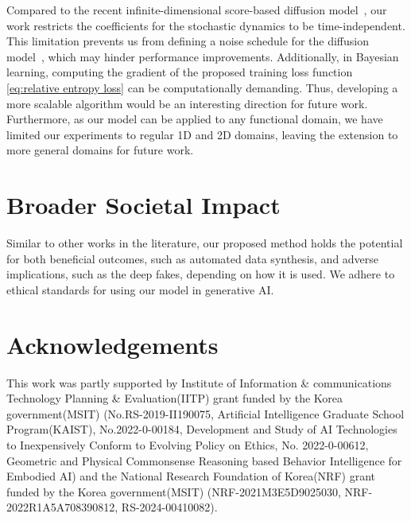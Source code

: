 \documentclass[nohyperref]{article}
\theoremstyle{plain}
\theoremstyle{remark}
\begin{document}
Compared to the recent infinite-dimensional score-based diffusion model~\citep{lim2023scorebased}, our work restricts the coefficients for the stochastic dynamics to be time-independent. This limitation prevents us from defining a noise schedule for the diffusion model~\citep{zhou2024denoising}, which may hinder performance improvements. Additionally, in Bayesian learning, computing the gradient of the proposed training loss function \eqref{eq:relative entropy loss} can be computationally demanding. Thus, developing a more scalable algorithm would be an interesting direction for future work. Furthermore, as our model can be applied to any functional domain, we have limited our experiments to regular 1D and 2D domains, leaving the extension to more general domains for future work.

\section*{Broader Societal Impact}
Similar to other works in the literature, our proposed method holds the potential for both beneficial outcomes, such as automated data synthesis, and adverse implications, such as the deep fakes, depending on how it is used. We adhere to ethical standards for using our model in generative AI.

\section*{Acknowledgements}
This work was partly supported by Institute of Information \& communications Technology Planning \& Evaluation(IITP) grant funded by the Korea government(MSIT) (No.RS-2019-II190075, Artificial Intelligence Graduate School Program(KAIST), No.2022-0-00184, Development and Study of AI Technologies to Inexpensively Conform to Evolving Policy on Ethics, No. 2022-0-00612, Geometric and Physical Commonsense Reasoning based Behavior Intelligence for Embodied AI) and the National Research Foundation of Korea(NRF) grant funded by the Korea government(MSIT) (NRF-2021M3E5D9025030, NRF-2022R1A5A708390812, RS-2024-00410082).





\newpage
\appendix
\newpage
\onecolumn



\setcounter{figure}{0}
\setcounter{table}{0}
\setcounter{equation}{0}
\setcounter{theorem}{0}
\end{document}
